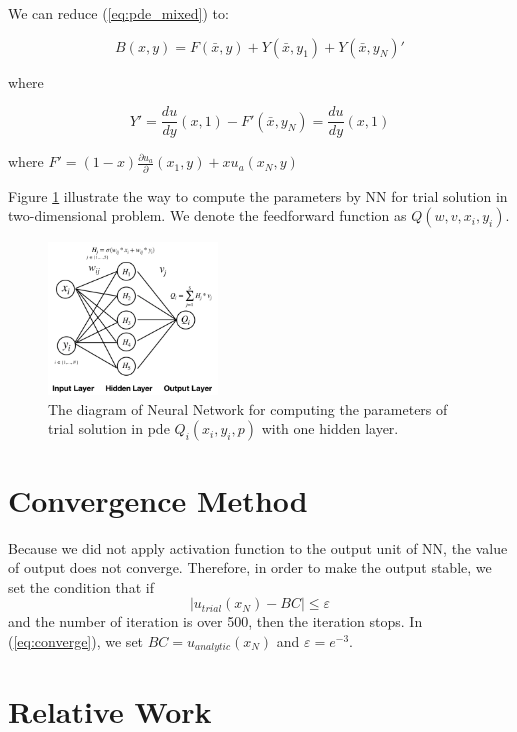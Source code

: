 \documentclass{article}
\begin{document}
We can reduce (\ref{eq:pde_mixed}) to:

\begin{equation}
B(x,y)=F(\bar{x},y)+Y(\bar{x},y_1)+Y(\bar{x},y_N)'
\end{equation}

where 

\[{Y}'=\frac{d u}{dy}(x,1)-{F}'( \bar{x},y_N) = \frac{d u}{dy}(x,1)\]

where ${F}'=(1-x)\frac{\partial u_a}{\partial}(x_1,y)+xu_a(x_N,y)$

\medskip \noindent
Figure \ref{fig:nn_pde_struct} illustrate the way to compute the parameters by NN for trial solution in two-dimensional problem. We denote the feedforward function as $Q(w,v,x_i,y_i)$.

\begin{figure}
	\centering
	\includegraphics[width=0.4\textwidth]{nn_pde_struct.png}
	\caption{The diagram of Neural Network for computing the parameters of trial solution in pde $Q_{i}(x_i,y_i,p)$ with one hidden layer. }
	\label{fig:nn_pde_struct}
\end{figure}


\section{Convergence Method}

Because we did not apply activation function to the output unit of NN, the value of output does not converge. Therefore, in order to make the output stable, we set the condition that if
\begin{equation}\label{eq:converge}
| u_{trial}(x_N) - BC| \leq \varepsilon
\end{equation}
\medspace \noindent
and the number of iteration is over 500, then the iteration stops. In (\ref{eq:converge}), we set $BC=u_{analytic}(x_N)$ and $\varepsilon=e^{-3}$.







\section{Relative Work}
\end{document}
